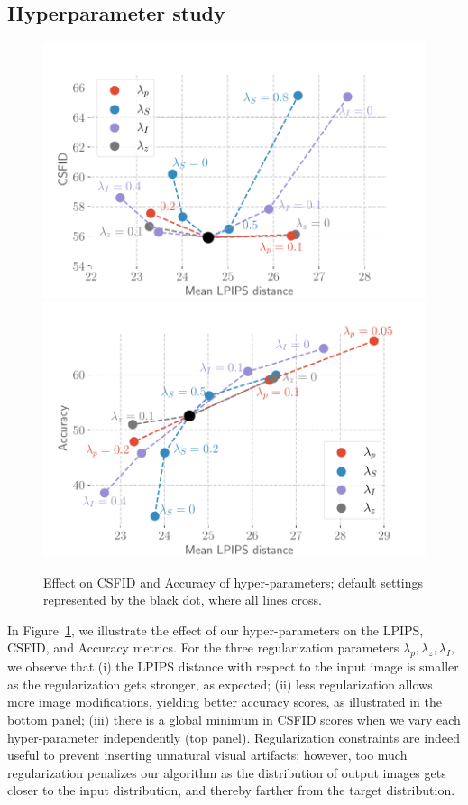 \subsection{Hyperparameter study}\label{hparam}

\begin{figure}[h!]
    \centering
    \includegraphics[width=\linewidth]{images/flexit/assets/hparam_fig.pdf}
    \includegraphics[width=\linewidth]{images/flexit/assets/hparam_acc.pdf}
    \caption{Effect  on \ac{CSFID} and Accuracy of hyper-parameters;  default settings  represented by 
    the black dot, where all lines cross.}
\label{fig:hparam_csfid}
\end{figure}


In Figure~\ref{fig:hparam_csfid}, we illustrate the effect of our hyper-parameters on
 the \ac{LPIPS}, \ac{CSFID}, and Accuracy metrics. 
For the three regularization parameters $\lambda_p, \lambda_z, \lambda_I$, we observe
 that
(i) the \ac{LPIPS} distance with respect to the input image is smaller as the regularization 
gets stronger, as expected; 
(ii) less regularization allows more image modifications, yielding better accuracy
 scores, as illustrated in the bottom panel; 
(iii) there is a global minimum in \ac{CSFID} scores when we vary each hyper-parameter 
 independently (top panel). Regularization constraints are indeed useful to prevent
  inserting unnatural visual artifacts; however, too much regularization penalizes our 
  algorithm as the distribution of output images gets closer to the input distribution, 
  and thereby farther from the  target distribution.


